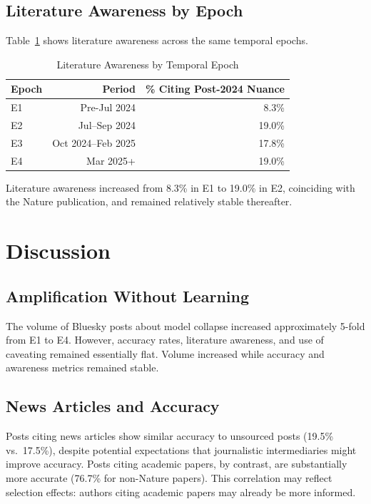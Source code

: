 \documentclass[11pt,preprint]{article}
\begin{document}
\subsection{Literature Awareness by Epoch}

Table~\ref{tab:awareness_epoch} shows literature awareness across the same temporal epochs.

\begin{table}[h]
\centering
\caption{Literature Awareness by Temporal Epoch}
\label{tab:awareness_epoch}
\begin{tabular}{lrr}
\toprule
\textbf{Epoch} & \textbf{Period} & \textbf{\% Citing Post-2024 Nuance} \\
\midrule
E1 & Pre-Jul 2024 & 8.3\% \\
E2 & Jul--Sep 2024 & 19.0\% \\
E3 & Oct 2024--Feb 2025 & 17.8\% \\
E4 & Mar 2025+ & 19.0\% \\
\bottomrule
\end{tabular}
\end{table}

Literature awareness increased from 8.3\% in E1 to 19.0\% in E2, coinciding with the Nature publication, and remained relatively stable thereafter.

\section{Discussion}
\label{sec:discussion}

\subsection{Amplification Without Learning}
The volume of Bluesky posts about model collapse increased approximately 5-fold from E1 to E4. However, accuracy rates, literature awareness, and use of caveating remained essentially flat. Volume increased while accuracy and awareness metrics remained stable.

\subsection{News Articles and Accuracy}
Posts citing news articles show similar accuracy to unsourced posts (19.5\% vs.\ 17.5\%), despite potential expectations that journalistic intermediaries might improve accuracy. Posts citing academic papers, by contrast, are substantially more accurate (76.7\% for non-Nature papers). This correlation may reflect selection effects: authors citing academic papers may already be more informed.
\end{document}
